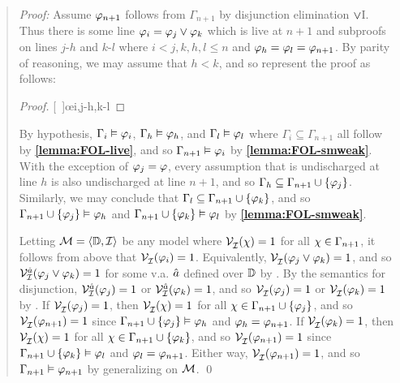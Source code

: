 \begin{quote} 
  \textit{Proof:} Assume $\varphi_{n+1}$ follows from $\Gamma_{n+1}$ by disjunction elimination $\vee$I.
  Thus there is some line $\varphi_i=\varphi_j\vee\varphi_k$ which is live at $n+1$ and subproofs on lines $j$-$h$ and $k$-$l$ where $i<j,k,h,l\leq n$ and $\varphi_h=\varphi_l=\varphi_{n+1}$.
  By parity of reasoning, we may assume that $h<k$, and so represent the proof as follows:

  \begin{proof}
  \open
     
  \close
  \open
     
  \close
  [\ ]{\metaC}\oe{i,j-h,k-l} 
  \end{proof}

  By hypothesis, $\Gamma_i\vDash \varphi_i$, $\Gamma_h\vDash \varphi_h$, and $\Gamma_l\vDash \varphi_l$ where $\Gamma_i\subseteq \Gamma_{n+1}$ all follow by \textbf{\ref{lemma:FOL-live}}, and so $\Gamma_{n+1} \vDash \varphi_i$ by \textbf{\ref{lemma:FOL-smweak}}.
  With the exception of $\varphi_j=\varphi$, every assumption that is undischarged at line $h$ is also undischarged at line $n+1$, and so $\Gamma_h\subseteq\Gamma_{n+1}\cup\lbrace\varphi_j\rbrace$.
  Similarly, we may conclude that $\Gamma_l\subseteq\Gamma_{n+1}\cup\lbrace\varphi_k\rbrace$, and so $\Gamma_{n+1}\cup\lbrace\varphi_j\rbrace \vDash \varphi_h$ and $\Gamma_{n+1}\cup\lbrace\varphi_k\rbrace \vDash \varphi_l$ by \textbf{\ref{lemma:FOL-smweak}}.


  Letting $\mathcal{M}=\langle\mathbb{D},\mathcal{I}\rangle$ be any model where $\mathcal{V}_{\mathcal{I}}^{}(\chi) = 1$ for all $\chi \in \Gamma_{n+1}$, it follows from above that $\mathcal{V}_{\mathcal{I}}^{}(\varphi_i) = 1$.
  Equivalently, $\mathcal{V}_{\mathcal{I}}^{}(\varphi_j \vee \varphi_k) = 1$, and so $\mathcal{V}_{\mathcal{I}}^{\hat{a}}(\varphi_j\vee\varphi_k)=1$ for some v.a. $\hat{a}$ defined over $\mathbb{D}$ by .
  By the semantics for disjunction, $\mathcal{V}_{\mathcal{I}}^{\hat{a}}(\varphi_j)=1$ or $\mathcal{V}_{\mathcal{I}}^{\hat{a}}(\varphi_k)=1$, and so $\mathcal{V}_{\mathcal{I}}^{}(\varphi_j)=1$ or $\mathcal{V}_{\mathcal{I}}^{}(\varphi_k)=1$ by .
  If $\mathcal{V}_{\mathcal{I}}^{}(\varphi_j)=1$, then $\mathcal{V}_{\mathcal{I}}^{}(\chi)=1$ for all $\chi \in \Gamma_{n+1}\cup\lbrace\varphi_j\rbrace$, and so $\mathcal{V}_{\mathcal{I}}^{}(\varphi_{n+1})=1$ since $\Gamma_{n+1}\cup\lbrace\varphi_j\rbrace \vDash \varphi_h$ and $\varphi_h=\varphi_{n+1}$. 
  If $\mathcal{V}_{\mathcal{I}}^{}(\varphi_k)=1$, then $\mathcal{V}_{\mathcal{I}}^{}(\chi)=1$ for all $\chi \in \Gamma_{n+1}\cup\lbrace\varphi_k\rbrace$, and so $\mathcal{V}_{\mathcal{I}}^{}(\varphi_{n+1})=1$ since $\Gamma_{n+1}\cup\lbrace\varphi_k\rbrace \vDash \varphi_l$ and $\varphi_l=\varphi_{n+1}$.
  Either way, $\mathcal{V}_{\mathcal{I}}^{}(\varphi_{n+1})=1$, and so $\Gamma_{n+1} \vDash \varphi_{n+1}$ by generalizing on $\mathcal{M}$.
  \qed
\end{quote}

